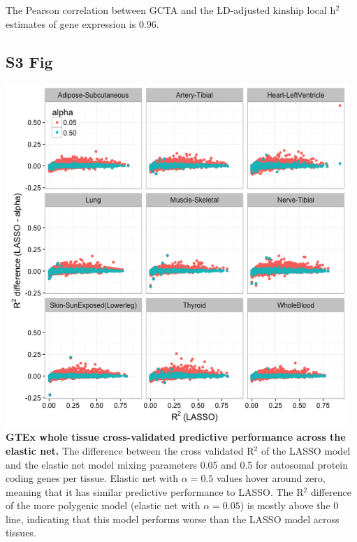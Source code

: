\documentclass[10pt,letterpaper]{article}
\begin{document}
\begin{singlespace}
 The Pearson correlation between GCTA and the LD-adjusted kinship local h$^2$ estimates of gene expression is 0.96.

\subsection*{S3 Fig}
\includegraphics[width=13cm]{Figures/GenArch_Supp/S2Fig.png}
\label{S3_Fig}
{\bf GTEx whole tissue cross-validated predictive performance across the elastic net.} The difference between the cross validated R$^2$ of the LASSO model and the elastic net model mixing parameters 0.05 and 0.5 for autosomal protein coding genes per tissue. Elastic net with $\alpha=0.5$ values hover around zero, meaning that it has similar predictive performance to LASSO. The R$^2$ difference of the more polygenic model (elastic net with $\alpha=0.05$) is mostly above the 0 line, indicating that this model performs worse than the LASSO model across tissues.


\end{singlespace}
\end{document}
